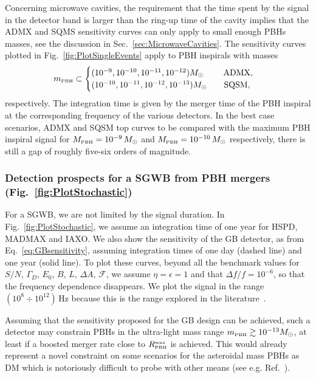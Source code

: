 \documentclass[11pt,a4paper]{article}
\newcommand{\PBH}{\text{\tiny PBH}}
\begin{document}
Concerning microwave cavities, the requirement that the time spent by the signal in the detector band is larger than the ring-up time of the cavity implies that the ADMX and SQMS sensitivity curves can only apply to small enough PBHs masses, see the discussion in Sec.~\ref{sec:MicrowaveCavities}.
The sensitivity curves plotted in Fig.~\ref{fig:PlotSingleEvents} apply to PBH inspirals with masses 
\begin{equation}
m_\text{\tiny PBH}\subset  
\begin{cases}
 (10^{-9}, 10^{-10}, 10^{-11}, 10^{-12})    M_\odot \qquad \,\, \text{ADMX}, \\
(10^{-10}, 10^{-11}, 10^{-12}, 10^{-13}) M_\odot \qquad \text{SQSM}, 
\end{cases}
\end{equation}
 respectively. The integration time is given by the merger time of the PBH inspiral at the corresponding frequency of the various detectors. In the best case scenarios, ADMX and SQSM top curves to be compared with the maximum PBH inspiral signal for $M_\text{\tiny PBH} = 10^{-9} \, M_\odot$ and $M_\text{\tiny PBH} = 10^{-10} \, M_\odot$ respectively, there is still a gap of roughly five-six orders of magnitude.


\subsubsection{Detection prospects for a SGWB from PBH mergers (Fig.~\ref{fig:PlotStochastic})}

For a SGWB, we are not limited by the signal duration. In Fig.~\ref{fig:PlotStochastic}, we assume an integration time of one year for HSPD, MADMAX and IAXO. 
We also show the sensitivity of the GB detector, as from Eq.~\eqref{eq:GBsensitivity}, assuming integration times of one day (dashed line) and one year (solid line). To plot these curves, beyond all the benchmark values for $S/N$, $\Gamma_D$, $E_0$, $B$, $L$, $\Delta A$, $\mathcal{F}$, we assume $\eta = \epsilon = 1$ and that $\Delta f/f = 10^{-6}$, so that the frequency dependence disappears. We plot the signal in the range $(10^8 \div 10^{12}) \, \text{Hz}$ because this is the range explored in the literature~\cite{Li:2000du, Li:2003tv, Li:2004df, Li:2006sx, Li:2008qr, Tong:2008rz, Stephenson:2009zz, Li:2009zzy, Li:2011zzl, Li:2013fna, Li:2014bma, Li:2015nti, Hou:05, Woods:2012upj, Ringwald:2020ist, Ringwald:2020ist}.

Assuming that the sensitivity proposed for the GB design can be achieved, such a detector may constrain PBHs in the ultra-light mass range $m_\PBH \gtrsim 10^{-13} M_\odot$, at least if a boosted merger rate close to $R_\PBH^\text{\tiny max}$ is achieved. This would already represent a novel constraint on some scenarios for the asteroidal mass PBHs as DM which is notoriously difficult to probe with other means (see e.g. Ref.~\cite{Montero-Camacho:2019jte}). 
\end{document}
